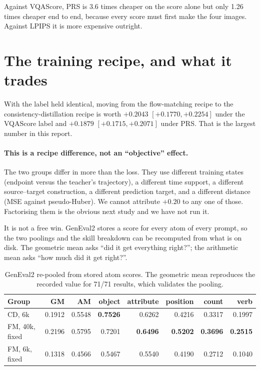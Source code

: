 \documentclass[11pt]{article}
\newcommand{\obs}[1]{\textcolor{obsblue}{#1}}
\newcommand{\bad}[1]{\textcolor{badred}{#1}}
\begin{document}
Against VQAScore, PRS is \obs{3.6} times cheaper on the score alone but only \bad{\obs{1.26}} times
cheaper end to end, because every score must first make the four images. Against LPIPS it is more
expensive outright.

\section{The training recipe, and what it trades}
\label{sec:objective}

With the label held identical, moving from the flow-matching recipe to the consistency-distillation
recipe is worth \obs{$+0.2043$} $[+0.1770,+0.2254]$ under the VQAScore label and \obs{$+0.1879$}
$[+0.1715,+0.2071]$ under PRS. That is the largest number in this report.

\paragraph{This is a recipe difference, not an ``objective'' effect.}
The two groups differ in more than the loss. They use different training states (endpoint versus the
teacher's trajectory), a different time support, a different source--target construction, a different
prediction target, and a different distance (MSE against pseudo-Huber). We cannot attribute
\obs{$+0.20$} to any one of those. Factorising them is the obvious next study and we have not run
it.

It is not a free win. GenEval2 stores a score for every atom of every prompt, so the two poolings and
the skill breakdown can be recomputed from what is on disk. The geometric mean asks ``did it get
everything right?''; the arithmetic mean asks ``how much did it get right?''.

\begin{table}[h]
\centering
\caption{GenEval2 re-pooled from stored atom scores. The geometric mean reproduces the recorded
value for \obs{71/71} results, which validates the pooling.}
\label{tab:skills}
\small
\begin{tabular}{@{}lrrrrrrr@{}}
\toprule
Group & GM & AM & object & attribute & position & count & verb \\
\midrule
CD, \obs{6}k & \obs{0.1912} & \obs{0.5548} & \obs{\textbf{0.7526}} & \obs{0.6262} & \obs{0.4216} & \obs{0.3317} & \obs{0.1997} \\
FM, \obs{40}k, fixed & \obs{0.2196} & \obs{0.5795} & \obs{0.7201} & \obs{\textbf{0.6496}} & \obs{\textbf{0.5202}} & \obs{\textbf{0.3696}} & \obs{\textbf{0.2515}} \\
FM, \obs{6}k, fixed & \obs{0.1318} & \obs{0.4566} & \obs{0.5467} & \obs{0.5540} & \obs{0.4190} & \obs{0.2712} & \obs{0.1040} \\
\bottomrule
\end{tabular}
\end{table}
\end{document}
